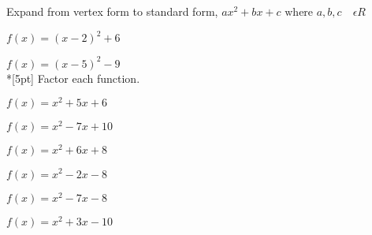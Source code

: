Expand from vertex form to standard form, $ax^2+bx+c \text{ where } a, b, c \quad  \epsilon R$
\item   $f(x)=(x-2)^2+6$
\item   $f(x)=(x-5)^2-9$\\*[5pt]
Factor each function.
\item   $f(x)=x^2+5x+6$
\item   $f(x)=x^2-7x+10$
\item   $f(x)=x^2+6x+8$
\item   $f(x)=x^2-2x-8$
\item   $f(x)=x^2-7x-8$
\item   $f(x)=x^2+3x-10$

